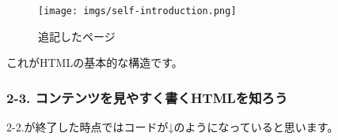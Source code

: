 \begin{figure}
\centering
\texttt{[image: imgs/self-introduction.png]}
\caption{追記したページ}
\end{figure}

これがHTMLの基本的な構造です。

\subsubsection{2-3.
コンテンツを見やすく書くHTMLを知ろう}\label{ux30b3ux30f3ux30c6ux30f3ux30c4ux3092ux898bux3084ux3059ux304fux66f8ux304fhtmlux3092ux77e5ux308dux3046}

2-2.が終了した時点ではコードが↓のようになっていると思います。

\begin{Shaded}
\begin{Highlighting}[]
\DataTypeTok{\textgreater{}}
\DataTypeTok{\textless{}}\OperatorTok{=}\DataTypeTok{\textgreater{}}
  \DataTypeTok{\textless{}}\DataTypeTok{\textgreater{}}
    \DataTypeTok{\textless{}}\OperatorTok{=}\OtherTok{ }\DataTypeTok{/\textgreater{}}
    \DataTypeTok{\textless{}}\OperatorTok{=}\OperatorTok{=}\OtherTok{ }\DataTypeTok{/\textgreater{}}
    \DataTypeTok{\textless{}}\DataTypeTok{\textgreater{}}\DataTypeTok{\textless{}/}\DataTypeTok{\textgreater{}}
  \DataTypeTok{\textless{}/}\DataTypeTok{\textgreater{}}
  \DataTypeTok{\textless{}}\DataTypeTok{\textgreater{}}
    \DataTypeTok{\textless{}}\DataTypeTok{\textgreater{}}\DataTypeTok{\textless{}/}\DataTypeTok{\textgreater{}}
    \DataTypeTok{\textless{}}\DataTypeTok{\textgreater{}}\DataTypeTok{\textless{}/}\DataTypeTok{\textgreater{}}
    \DataTypeTok{\textless{}}\DataTypeTok{\textgreater{}}
      \DataTypeTok{\textless{}}\DataTypeTok{\textgreater{}}\DataTypeTok{\textless{}}\DataTypeTok{\textgreater{}}\DataTypeTok{\textless{}/}\DataTypeTok{\textgreater{}\textless{}/}\DataTypeTok{\textgreater{}}

\end{Highlighting}
\end{Shaded}
